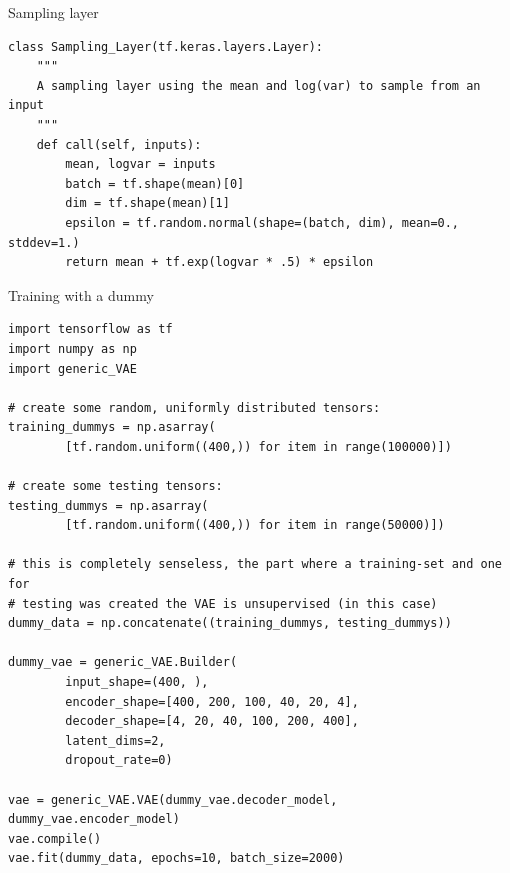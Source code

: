\documentclass{beamer}
\begin{document}
\begin{frame}[fragile]{Sampling layer}

    \tiny{
        \begin{verbatim}
class Sampling_Layer(tf.keras.layers.Layer):                                 
    """                                                                      
    A sampling layer using the mean and log(var) to sample from an input     
    """                                                                      
    def call(self, inputs):                                                  
        mean, logvar = inputs                                                
        batch = tf.shape(mean)[0]                                            
        dim = tf.shape(mean)[1]                                              
        epsilon = tf.random.normal(shape=(batch, dim), mean=0., stddev=1.)   
        return mean + tf.exp(logvar * .5) * epsilon                          
        \end{verbatim}
    }
\end{frame}

\begin{frame}[fragile]{Training with a dummy}
    \tiny{
        \begin{verbatim}
import tensorflow as tf                                                       
import numpy as np                                                            
import generic_VAE                                                            

# create some random, uniformly distributed tensors:                          
training_dummys = np.asarray(                                                 
        [tf.random.uniform((400,)) for item in range(100000)])                

# create some testing tensors:                                                
testing_dummys = np.asarray(                                                  
        [tf.random.uniform((400,)) for item in range(50000)])                 

# this is completely senseless, the part where a training-set and one for     
# testing was created the VAE is unsupervised (in this case)                  
dummy_data = np.concatenate((training_dummys, testing_dummys))                

dummy_vae = generic_VAE.Builder(                                              
        input_shape=(400, ),                                                  
        encoder_shape=[400, 200, 100, 40, 20, 4],                             
        decoder_shape=[4, 20, 40, 100, 200, 400],                             
        latent_dims=2,                                                        
        dropout_rate=0)                                                       

vae = generic_VAE.VAE(dummy_vae.decoder_model, dummy_vae.encoder_model)       
vae.compile()                                                                 
vae.fit(dummy_data, epochs=10, batch_size=2000)                               
        \end{verbatim}
    } 
\end{frame}    
\end{document}
